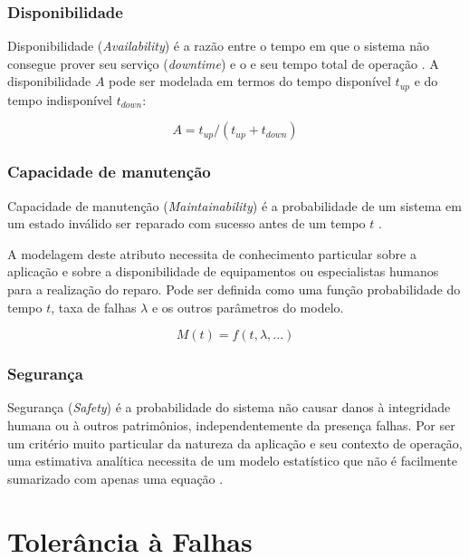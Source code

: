 \subsubsection{Disponibilidade}

Disponibilidade (\textit{Availability}) é a razão entre o tempo em que o sistema não consegue prover seu serviço (\textit{downtime}) e o e seu tempo total de operação \cite{FaultInjectionTechniques}. A disponibilidade $A$ pode ser modelada em termos do tempo disponível $t_{up}$ e do tempo indisponível $t_{down}$:

\begin{equation}
    A = t_{up} / (t_{up} + t_{down})
\end{equation}

\subsubsection{Capacidade de manutenção}

Capacidade de manutenção (\textit{Maintainability}) é a probabilidade de um sistema em um estado inválido ser reparado com sucesso antes de um tempo $t$ \cite{FaultInjectionTechniques}.

A modelagem deste atributo necessita de conhecimento particular sobre a aplicação e sobre a disponibilidade de equipamentos ou especialistas humanos para a realização do reparo. Pode ser definida como uma função probabilidade do tempo $t$, taxa de falhas $\lambda$ e os outros parâmetros do modelo.

\begin{equation}
    M(t) = f(t, \lambda, ...)
\end{equation}

\subsubsection{Segurança}

Segurança (\textit{Safety}) é a probabilidade do sistema não causar danos à integridade humana ou à outros patrimônios, independentemente da presença falhas. Por ser um critério muito particular da natureza da aplicação e seu contexto de operação, uma estimativa analítica necessita de um modelo estatístico que não é facilmente sumarizado com apenas uma equação \cite{FaultInjectionTechniques}.

\section{Tolerância à Falhas}

